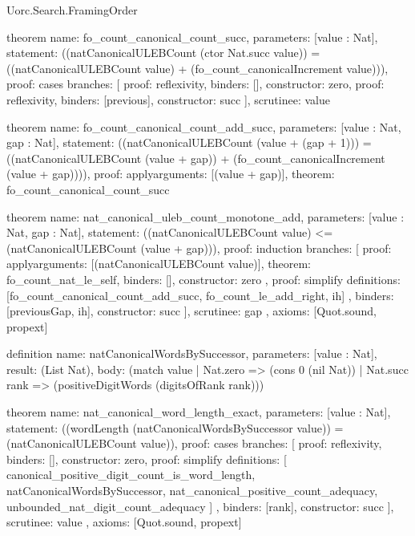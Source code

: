 \begin{lexlean}{Uorc.Search.FramingOrder}
\begin{semanticmodule}
theorem{
  name: fo_count_canonical_count_succ,
  parameters: [value : Nat],
  statement: ((natCanonicalULEBCount (ctor Nat.succ value)) = ((natCanonicalULEBCount value) + (fo_count_canonicalIncrement value))),
  proof: cases{
    branches: [
      {proof: reflexivity{}, binders: [], constructor: zero},
      {proof: reflexivity{}, binders: [previous], constructor: succ}
    ],
    scrutinee: value
  }
}

theorem{
  name: fo_count_canonical_count_add_succ,
  parameters: [value : Nat, gap : Nat],
  statement: ((natCanonicalULEBCount (value + (gap + 1))) = ((natCanonicalULEBCount (value + gap)) + (fo_count_canonicalIncrement (value + gap)))),
  proof: apply{arguments: [(value + gap)], theorem: fo_count_canonical_count_succ}
}

theorem{
  name: nat_canonical_uleb_count_monotone_add,
  parameters: [value : Nat, gap : Nat],
  statement: ((natCanonicalULEBCount value) <= (natCanonicalULEBCount (value + gap))),
  proof: induction{
    branches: [
      {
        proof: apply{arguments: [(natCanonicalULEBCount value)], theorem: fo_count_nat_le_self},
        binders: [],
        constructor: zero
      },
      {
        proof: simplify{
          definitions: [fo_count_canonical_count_add_succ, fo_count_le_add_right, ih]
        },
        binders: [previousGap, ih],
        constructor: succ
      }
    ],
    scrutinee: gap
  },
  axioms: [Quot.sound, propext]
}

definition{
  name: natCanonicalWordsBySuccessor,
  parameters: [value : Nat],
  result: (List Nat),
  body: (match value
    | Nat.zero => (cons 0 (nil Nat))
    | Nat.succ rank => (positiveDigitWords (digitsOfRank rank)))
}

theorem{
  name: nat_canonical_word_length_exact,
  parameters: [value : Nat],
  statement: ((wordLength (natCanonicalWordsBySuccessor value)) = (natCanonicalULEBCount value)),
  proof: cases{
    branches: [
      {proof: reflexivity{}, binders: [], constructor: zero},
      {
        proof: simplify{
          definitions: [
            canonical_positive_digit_count_is_word_length,
            natCanonicalWordsBySuccessor,
            nat_canonical_positive_count_adequacy,
            unbounded_nat_digit_count_adequacy
          ]
        },
        binders: [rank],
        constructor: succ
      }
    ],
    scrutinee: value
  },
  axioms: [Quot.sound, propext]
}


\end{semanticmodule}
\end{lexlean}
